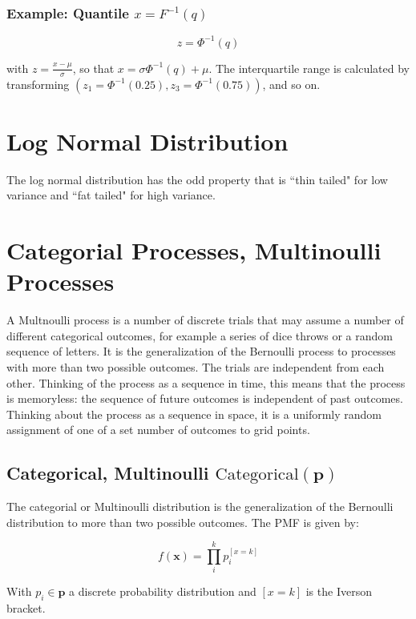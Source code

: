 \subsubsection{Example: Quantile $x = F^{-1}(q)$}

\begin{equation}
z = \Phi^{-1}(q)
\end{equation}

with $z = \frac{x-\mu}{\sigma}$, so that $x = \sigma \Phi^{-1}(q)+\mu$. The interquartile range is calculated by transforming $(z_{1}=\Phi^{-1}(0.25),z_{3}=\Phi^{-1}(0.75))$, and so on.


\section{Log Normal Distribution}
The log normal distribution has the odd property that is ``thin tailed" for low variance and ``fat tailed" for high variance.

\section{Categorial Processes, Multinoulli Processes}
A Multnoulli process is a number of discrete trials that may assume a number of different categorical outcomes, for example a series of dice throws or a random sequence of letters. It is the generalization of the Bernoulli process to processes with more than two possible outcomes. The trials are independent from each other. Thinking of the process as a sequence in time, this means that the process is memoryless: the sequence of future outcomes is independent of past outcomes. Thinking about the process as a sequence in space, it is a uniformly random assignment of one of a set number of outcomes to grid points.

\subsection{Categorical, Multinoulli $\mathrm{Categorical(\mathbf{p})}$}
The categorial or Multinoulli distribution is the generalization of the Bernoulli distribution to more than two possible outcomes. The PMF is given by:

\begin{equation}
f(\mathbf{x}) = \prod_i^k p_i^{[x=k]}
\end{equation}

With $p_i \in \mathbf{p}$ a discrete probability distribution and $[x=k]$ is the Iverson bracket.

